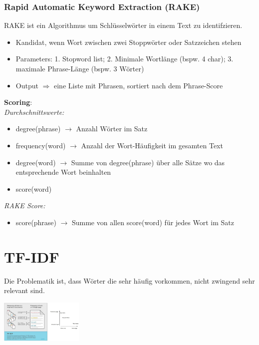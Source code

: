 \documentclass{article}
\newenvironment{Figure}
	{\par\medskip\noindent\minipage{\linewidth}}
	{\endminipage\par\medskip}
\theoremstyle{merke}
\theoremstyle{definition}
\begin{document}
		\subsubsection{Rapid Automatic Keyword Extraction (RAKE)}
        RAKE ist ein Algorithmus um Schlüsselwörter in einem Text zu identifzieren. 
        \begin{itemize}
            \item Kandidat, wenn Wort zwischen zwei Stoppwörter oder Satzzeichen stehen
            \item Parameters: 1. Stopword list; 2. Minimale Wortlänge (bspw. 4 char); 3. maximale Phrase-Länge (bspw. 3 Wörter)
            \item Output $\Rightarrow$ eine Liste mit Phrasen, sortiert nach dem Phrase-Score
        \end{itemize}

        \textbf{Scoring}:\\
        \t \textit{Durchschnittswerte:}
        \begin{itemize}
            \item degree(phrase) $\rightarrow$ Anzahl Wörter im Satz 
            \item frequency(word) $\rightarrow$ Anzahl der Wort-Häufigkeit im gesamten Text
            \item degree(word) $\rightarrow$ Summe von degree(phrase) über alle Sätze wo das entsprechende Wort beinhalten
            \item score(word)
        \end{itemize}

        \t \textit{RAKE Score:}
        \begin{itemize}
            \item score(phrase) $\rightarrow$ Summe von allen score(word) für jedes Wort im Satz
        \end{itemize}
    
    \section{TF-IDF}
    Die Problematik ist, dass Wörter die sehr häufig vorkommen, nicht zwingend sehr relevant sind.
    \begin{Figure}
    \centering
    \includegraphics[width=150px]{img/WordImportance.png}
        \label{fig:Häufigkeit der Wörter in Bezug auf ihre Relevanz}
    \end{Figure}
    
\end{document}
